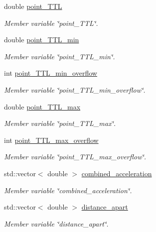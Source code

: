 \begin{DoxyCompactItemize}
double \mbox{\hyperlink{classPoint_aa839d0ecb9c12b07ee2600344d5bedeb}{point\+\_\+\+T\+TL}}
\begin{DoxyCompactList}\small\item\em Member variable \char`\"{}point\+\_\+\+T\+T\+L\char`\"{}. \end{DoxyCompactList}\item 
double \mbox{\hyperlink{classPoint_abae86f9c65f86d2843551e89bc5c18fa}{point\+\_\+\+T\+T\+L\+\_\+min}}
\begin{DoxyCompactList}\small\item\em Member variable \char`\"{}point\+\_\+\+T\+T\+L\+\_\+min\char`\"{}. \end{DoxyCompactList}\item 
int \mbox{\hyperlink{classPoint_af45f32c8b67614d680a4d85996ba64f7}{point\+\_\+\+T\+T\+L\+\_\+min\+\_\+overflow}}
\begin{DoxyCompactList}\small\item\em Member variable \char`\"{}point\+\_\+\+T\+T\+L\+\_\+min\+\_\+overflow\char`\"{}. \end{DoxyCompactList}\item 
double \mbox{\hyperlink{classPoint_ad466df219c14f585d5cd10f9eac6f929}{point\+\_\+\+T\+T\+L\+\_\+max}}
\begin{DoxyCompactList}\small\item\em Member variable \char`\"{}point\+\_\+\+T\+T\+L\+\_\+max\char`\"{}. \end{DoxyCompactList}\item 
int \mbox{\hyperlink{classPoint_a14a0d7be9c2ada24628d6b89524def44}{point\+\_\+\+T\+T\+L\+\_\+max\+\_\+overflow}}
\begin{DoxyCompactList}\small\item\em Member variable \char`\"{}point\+\_\+\+T\+T\+L\+\_\+max\+\_\+overflow\char`\"{}. \end{DoxyCompactList}\item 
std\+::vector$<$ double $>$ \mbox{\hyperlink{classPoint_aa71ef0cdabcc5fbb4b3e6532b76b4027}{combined\+\_\+acceleration}}
\begin{DoxyCompactList}\small\item\em Member variable \char`\"{}combined\+\_\+acceleration\char`\"{}. \end{DoxyCompactList}\item 
std\+::vector$<$ double $>$ \mbox{\hyperlink{classPoint_adab2c73402406c954413b98a7f608154}{distance\+\_\+apart}}
\begin{DoxyCompactList}\small\item\em Member variable \char`\"{}distance\+\_\+apart\char`\"{}. \end{DoxyCompactList}\item 

\end{DoxyCompactItemize}
